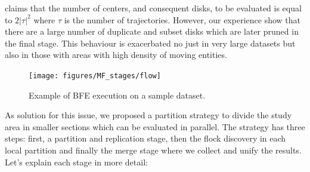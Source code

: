 \cite{vieira_2009} claims that the number of centers, and consequent disks, to be evaluated is equal to $2\lvert\tau\rvert^2$ where $\tau$ is the number of trajectories.  However, our experience show that there are a large number of duplicate and subset disks which are later pruned in the final stage.  This behaviour is exacerbated no just in very large datasets but also in those with areas with high density of moving entities.

\begin{figure}
    \centering
    \texttt{[image: figures/MF\_stages/flow]}
    \caption{Example of BFE execution on a sample dataset.}\label{fig:example}
\end{figure}

As solution for this issue, we proposed a partition strategy to divide the study area in smaller sections which can be evaluated in parallel.  The strategy has three steps: first, a partition and replication stage, then the flock discovery in each local partition and finally the merge stage where we collect and unify the results.  Let's explain each stage in more detail:

